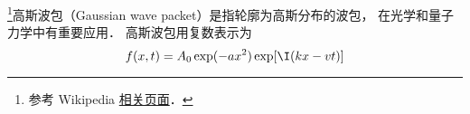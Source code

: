 
\begin{issues}
\issueDraft
\end{issues}


\footnote{参考 Wikipedia \href{https://en.wikipedia.org/wiki/Wave_packet}{相关页面}．}高斯波包（Gaussian wave packet）是指轮廓为高斯分布的波包， 在光学和量子力学中有重要应用． 高斯波包用复数表示为
\begin{equation}
f(x, t) = A_0 \exp(-ax^2)\exp[\I (k x - vt)]
\end{equation}
